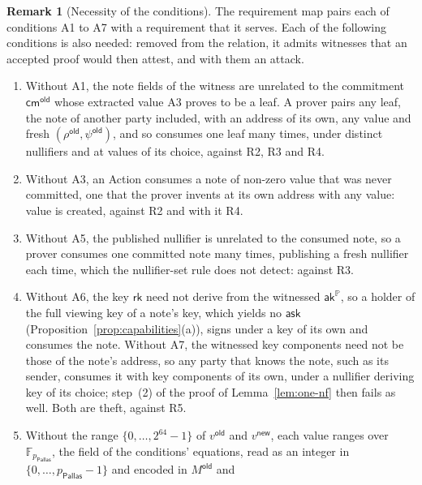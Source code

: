 \documentclass[11pt,a4paper]{article}
\theoremstyle{definition}
\newtheorem{remark}[theorem]{Remark}
\newcommand{\F}{\mathbb{F}}
\newcommand{\PP}{\mathbb{P}}
\newcommand{\cmsym}{\mathsf{cm}}
\newcommand{\rk}{\mathsf{rk}}
\newcommand{\Pallas}{\ensuremath{\mathsf{Pallas}}}
\newcommand{\ask}{\ensuremath{\mathsf{ask}}}
\newcommand{\aksym}{\ensuremath{\mathsf{ak}}}
\begin{document}
\begin{remark}[Necessity of the conditions]
The requirement map pairs each of conditions A1 to A7 with a requirement
that it serves. Each of the following conditions is also needed: removed
from the relation, it admits witnesses that an accepted proof would then
attest, and with them an attack.
\begin{enumerate}[label=(\roman*)]
\item Without A1, the note fields of the witness are unrelated to the
  commitment $\cmsym^{\mathsf{old}}$ whose extracted value A3 proves to be a
  leaf. A prover pairs any leaf, the note of another party included, with an
  address of its own, any value and fresh $(\rho^{\mathsf{old}},
  \psi^{\mathsf{old}})$, and so consumes one leaf many times, under distinct
  nullifiers and at values of its choice, against R2, R3 and R4.
\item Without A3, an Action consumes a note of non-zero value that was never
  committed, one that the prover invents at its own address with any value:
  value is created, against R2 and with it R4.
\item Without A5, the published nullifier is unrelated to the consumed note,
  so a prover consumes one committed note many times, publishing a fresh
  nullifier each time, which the nullifier-set rule does not detect: against
  R3.
\item Without A6, the key $\rk$ need not derive from the witnessed
  $\aksym^{\PP}$, so a holder of the full viewing key of a note's key, which
  yields no $\ask$ (Proposition~\ref{prop:capabilities}(a)), signs under a
  key of its own and consumes the note. Without A7, the witnessed key
  components need not be those of the note's address, so any party that
  knows the note, such as its sender, consumes it with key components of its
  own, under a nullifier deriving key of its choice; step~(2) of the proof of
  Lemma~\ref{lem:one-nf} then fails as well. Both are theft, against R5.
\item Without the range $\{0, \dots, 2^{64} - 1\}$ of $v^{\mathsf{old}}$
  and $v^{\mathsf{new}}$, each value ranges over $\F_{p_{\Pallas}}$, the
  field of the conditions' equations, read as an integer in
  $\{0, \dots, p_{\Pallas} - 1\}$ and encoded in $M^{\mathsf{old}}$ and

\end{enumerate}
\end{remark}
\end{document}
